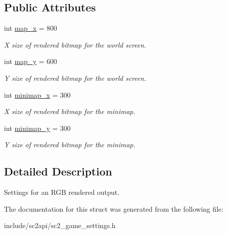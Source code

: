\subsection*{Public Attributes}
\begin{DoxyCompactItemize}
\item 
\mbox{\label{structsc2_1_1_render_settings_a330b0d96688b42703928e26e0feb305f}} 
int \hyperlink{structsc2_1_1_render_settings_a330b0d96688b42703928e26e0feb305f}{map\+\_\+x} = 800
\begin{DoxyCompactList}\small\item\em X size of rendered bitmap for the world screen. \end{DoxyCompactList}\item 
\mbox{\label{structsc2_1_1_render_settings_ac565d5076b37c1ad8d6a7896900af9f7}} 
int \hyperlink{structsc2_1_1_render_settings_ac565d5076b37c1ad8d6a7896900af9f7}{map\+\_\+y} = 600
\begin{DoxyCompactList}\small\item\em Y size of rendered bitmap for the world screen. \end{DoxyCompactList}\item 
\mbox{\label{structsc2_1_1_render_settings_a9c0da03ae27b40786ed3b78b978731ca}} 
int \hyperlink{structsc2_1_1_render_settings_a9c0da03ae27b40786ed3b78b978731ca}{minimap\+\_\+x} = 300
\begin{DoxyCompactList}\small\item\em X size of rendered bitmap for the minimap. \end{DoxyCompactList}\item 
\mbox{\label{structsc2_1_1_render_settings_af939a393029d7cb7c899e7da543b8bb4}} 
int \hyperlink{structsc2_1_1_render_settings_af939a393029d7cb7c899e7da543b8bb4}{minimap\+\_\+y} = 300
\begin{DoxyCompactList}\small\item\em Y size of rendered bitmap for the minimap. \end{DoxyCompactList}\end{DoxyCompactItemize}


\subsection{Detailed Description}
Settings for an R\+GB rendered output. 

The documentation for this struct was generated from the following file\+:\begin{DoxyCompactItemize}
\item 
include/sc2api/sc2\+\_\+game\+\_\+settings.\+h\end{DoxyCompactItemize}

